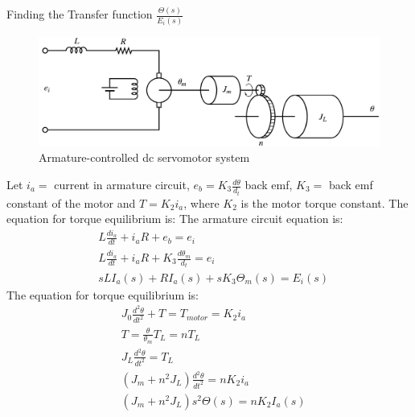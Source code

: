 \documentclass[12pt]{article}
\newenvironment{problem}[2][Problem]{\begin{trivlist}
		\item[\hskip \labelsep {\bfseries #1}\hskip \labelsep {\bfseries #2.}]}{\end{trivlist}}
\begin{document}
\begin{problem}{4 --- (B)-3–13 --- obtain transfer function} \hfill\newline
Finding the Transfer function $\displaystyle \frac{\Theta(s)}{E_i(s)}$
\begin{figure}[H]
	\centering
	\includegraphics[width=0.7\linewidth]{Images/Q4}
	\caption{Armature-controlled dc servomotor system}
	\label{fig:q4}
\end{figure}
\end{problem}
Let $i_a=$ current in armature circuit, $e_b=K_3\frac{d \theta}{d_t}$ back emf, $K_3=$ back emf constant of the motor and $T= K_2i_a$, where $K_2$ is the motor torque constant. \newline \newline 
The equation for torque equilibrium is:
The armature circuit equation is:
\begin{align}
& L \frac{di_a }{dt}+i_aR+e_b=e_i	\nonumber \\ %
& L \frac{di_a }{dt}+i_aR + K_3\frac{d \theta_m}{d_t}=e_i \nonumber \\ %
& sLI_a(s) + RI_a(s) + sK_3 \Theta_m (s) = E_i(s) 	\label{eq:Q4:1}%
\end{align}
The equation for torque equilibrium is:
\begin{align}
& J_0\frac{d^2\theta}{dt^2} + T = T_{motor} = K_2i_a \nonumber \\ %
& T = \frac{\theta}{\theta_m} T_L = n T_L \nonumber \\
& J_L\frac{d^2\theta}{dt^2} = T_L \nonumber \\
& (J_m + n^2J_L)\frac{d^2\theta}{dt^2} = nK_2i_a \nonumber \\ %
& (J_m+n^2J_L)s^2\Theta(s)=nK_2I_a(s) \label{eq:Q4:2} %
\end{align}
\end{document}
